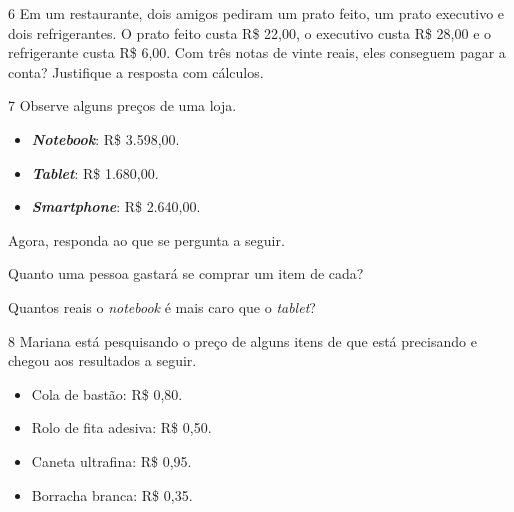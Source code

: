 \num{6} Em um restaurante, dois amigos pediram um prato feito, um prato executivo
e dois refrigerantes. O prato feito custa R\$ 22,00, o executivo custa R\$
28,00 e o refrigerante custa R\$ 6,00. Com três notas de vinte reais, eles
conseguem pagar a conta? Justifique a resposta com cálculos.

\begin{mdframed}[linewidth=2pt,linecolor=salmao,roundcorner=2pt]


\vspace{3cm}
\end{mdframed}

\num{7} Observe alguns preços de uma loja.

\begin{mdframed}[linewidth=2pt,linecolor=azul!20,backgroundcolor=azul!20,roundcorner=2pt]
\begin{itemize}
  \item \textbf{\textit{Notebook}}: R\$ 3.598,00.
  \item \textbf{\textit{Tablet}}: R\$ 1.680,00.
  \item \textbf{\textit{Smartphone}}: R\$ 2.640,00.
\end{itemize}
\end{mdframed}

Agora, responda ao que se pergunta a seguir.

\begin{escolha}
\item
  Quanto uma pessoa gastará se comprar um item de cada?


\item
  Quantos reais o \textit{notebook} é mais caro que o \textit{tablet}?

\end{escolha}


\num{8} Mariana está pesquisando o preço de alguns itens de que está precisando e chegou aos resultados a seguir.

\begin{mdframed}[linewidth=2pt,linecolor=azul!20,backgroundcolor=azul!20,roundcorner=2pt]
\begin{itemize}
  \item Cola de bastão: R\$ 0,80.
  \item Rolo de fita adesiva: R\$ 0,50.
  \item Caneta ultrafina: R\$ 0,95.
  \item Borracha branca: R\$ 0,35.
\end{itemize}
\end{mdframed}

